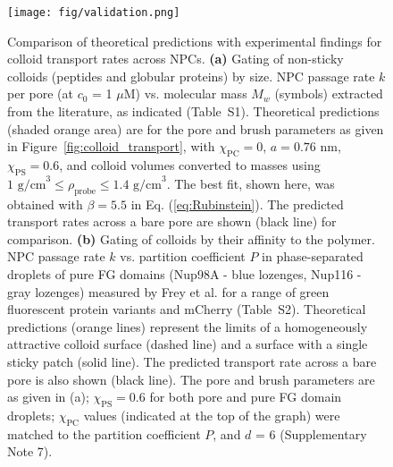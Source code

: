 \documentclass[12pt, a4paper]{article}
\begin{document}
\begin{figure}
    \centering
    \centerline{\texttt{[image: fig/validation.png]}}
    \caption{
    Comparison of theoretical predictions with experimental findings for colloid transport rates across NPCs.
    \textbf{(a)} 
    Gating of non-sticky colloids (peptides and globular proteins) by size.
    NPC passage rate $k$ per pore (at $c_0$ = 1 $\mu\text{M}$) vs. molecular mass $M_w$ (symbols) extracted from the literature, as indicated (Table~S1).
    Theoretical predictions (shaded orange area) are for the pore and brush parameters as given in Figure~\ref{fig:colloid_transport}, with $\chi_\text{PC} = 0$, $a = 0.76$ nm, $\chi_\text{PS} = 0.6$, and colloid volumes converted to masses using $\text{1 g/cm}^3 \leq \rho_\text{probe} \leq \text{1.4 g/cm}^3$.
    The best fit, shown here, was obtained with $\beta = 5.5$ in Eq. (\ref{eq:Rubinstein}).
    The predicted transport rates across a bare pore are shown (black line) for comparison.
    \textbf{(b)} 
    Gating of colloids by their affinity to the polymer.
    NPC passage rate $k$ vs. partition coefficient $P$ in phase-separated droplets of pure FG domains (Nup98A - blue lozenges, Nup116 - gray lozenges) measured by Frey et al. \cite{Frey2018} for a range of green fluorescent protein variants and mCherry (Table~S2).
    Theoretical predictions (orange lines) represent the limits of a homogeneously attractive colloid surface (dashed line) and a surface with a single sticky patch (solid line).
    The predicted transport rate across a bare pore is also shown (black line).
    The pore and brush parameters are as given in (a); $\chi_\text{PS} = 0.6$ for both pore and pure FG domain droplets; $\chi_\text{PC}$ values (indicated at the top of the graph) were matched to the partition coefficient $P$, and $d$ = 6 (Supplementary Note 7).
    }
    \label{fig:NPC_comparison}
\end{figure}
\end{document}
